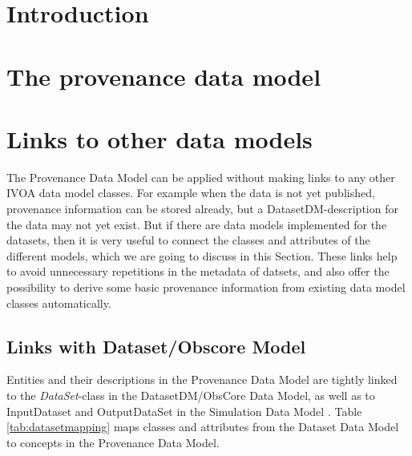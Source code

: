 \documentclass[11pt,a4paper]{ivoa}
\newcommand{\class}[1]{\emph{#1}}
\begin{document}
\section{Introduction}





\section{The provenance data model}



\section{Links to other data models}\label{sec:dmlinks}

The Provenance Data Model can be applied without making links to any other 
IVOA data model classes. For example when the data is not yet published, provenance information
can be stored already, but a DatasetDM-description for the data may not yet exist.
But if there are data models implemented for the datasets, then it is 
very useful to connect the classes and attributes of the different models, 
which we are going to discuss in this Section. These links help to avoid 
unnecessary repetitions in the metadata of datsets, and also offer the possibility 
to derive some basic provenance information from existing data model classes automatically.


\subsection{Links with Dataset/Obscore Model}
Entities and their descriptions in the Provenance Data Model 
are tightly linked to the \class{DataSet}-class in the DatasetDM/ObsCore Data Model, as well as to 
InputDataset and OutputDataSet in the Simulation Data Model \citep[SimDM,][]{std:SimDM}.
Table \ref{tab:datasetmapping} maps classes and attributes from the Dataset Data Model 
to concepts in the Provenance Data Model.
\end{document}
